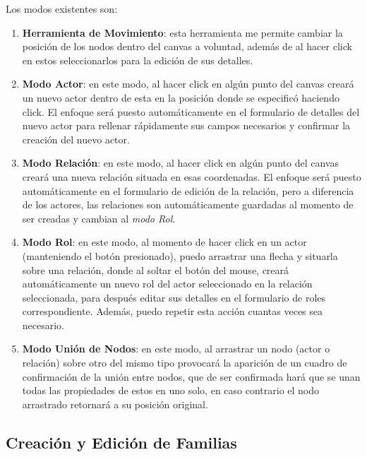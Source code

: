 Los modos existentes son:

  \begin{enumerate}
    \item \textbf{Herramienta de Movimiento}: esta herramienta me permite cambiar la posición de los nodos dentro del canvas a voluntad, además de al hacer click en estos seleccionarlos para la edición de sus detalles.
    \item \textbf{Modo Actor}: en este modo, al hacer click en algún punto del canvas creará un nuevo actor dentro de esta en la posición donde se especificó haciendo click. El enfoque será puesto automáticamente en el formulario de detalles del nuevo actor para rellenar rápidamente sus campos necesarios y confirmar la creación del nuevo actor.
    \item \textbf{Modo Relación}: en este modo, al hacer click en algún punto del canvas creará una nueva relación situada en esas coordenadas. El enfoque será puesto automáticamente en el formulario de edición de la relación, pero a diferencia de los actores, las relaciones son automáticamente guardadas al momento de ser creadas y cambian al \emph{modo Rol}.
    \item \textbf{Modo Rol}: en este modo, al momento de hacer click en un actor (manteniendo el botón presionado), puedo arrastrar una flecha y situarla sobre una relación, donde al soltar el botón del mouse, creará automáticamente un nuevo rol del actor seleccionado en la relación seleccionada, para después editar sus detalles en el formulario de roles correspondiente. Además, puedo repetir esta acción cuantas veces sea necesario.
    \item \textbf{Modo Unión de Nodos}: en este modo, al arrastrar un nodo (actor o relación) sobre otro del mismo tipo provocará la aparición de un cuadro de confirmación de la unión entre nodos, que de ser confirmada hará que se unan todas las propiedades de estos en uno solo, en caso contrario el nodo arrastrado retornará a su posición original.
  \end{enumerate}



\subsection{Creación y Edición de Familias} %
\label{sub:creacion_y_edicion_de_familias}

